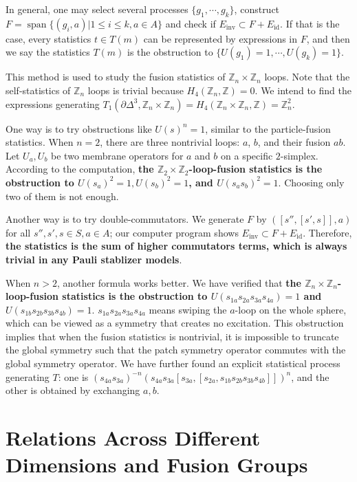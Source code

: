\documentclass[reprint, amsmath, amssymb, showpacs, floatfix, longbibliography, aps, twocolumn, superscriptaddress, nofootinbib]{revtex4-2}
\newcommand{\ZZ}{{\mathbb Z}}
\theoremstyle{definition}
\begin{document}
 In general, one may select several processes $\{g_1, \cdots, g_k\}$, construct $F=\operatorname{span}\{(g_i,a)|1\le i\le k,a\in A\}$ and check if $E_{\operatorname{inv}}\subset F + E_{\operatorname{id}}$. If that is the case, every statistics $t\in T(m)$ can be represented by expressions in $F$, and then we say the statistics $T(m)$ is the obstruction to $\{ U(g_1)=1, \cdots,  U(g_k)=1\}$.
 
 This method is used to study the fusion statistics of $\ZZ_n\times \ZZ_n$ loops. Note that the self-statistics of $\ZZ_n$ loops is trivial because $ H_4(\mathbb{Z}_n, \ZZ) = 0$. We intend to find the expressions generating $T_1(\partial \Delta^3,\ZZ_n\times \ZZ_n) = H_4(\mathbb{Z}_n \times \mathbb{Z}_n, \ZZ) = \mathbb{Z}_n^2$.
 
 One way is to try obstructions like $ U(s)^n=1$, similar to the particle-fusion statistics. When $n = 2$, there are three nontrivial loops: $a$, $b$, and their fusion $ab$. Let $U_a,U_b$ be two membrane operators for $a$ and $b$ on a specific $2$-simplex. According to the computation, \textbf{the $\ZZ_2\times \ZZ_2$-loop-fusion statistics is the obstruction to $ U(s_a)^2=1, U(s_b)^2=1$, and $ U(s_as_b)^2=1$}. Choosing only two of them is not enough.
 
 Another way is to try double-commutators. We generate $F$ by $([s'', [s', s]], a)$ for all $s'', s', s \in S,a\in A$; our computer program shows $E_{\operatorname{inv}}\subset F + E_{\operatorname{id}}$. Therefore, \textbf{the statistics is the sum of higher commutators terms, which is always trivial in any Pauli stablizer models}. 
 
 When $n>2$, another formula works better. We have verified that  \textbf{the $\ZZ_n\times \ZZ_n$-loop-fusion statistics is the obstruction to $ U(s_{1a} s_{2a} s_{3a} s_{4a})=1$ and $ U(s_{1b} s_{2b} s_{3b} s_{4b})=1$}. $s_{1a} s_{2a} s_{3a} s_{4a}$ means swiping the $a$-loop on the whole sphere, which can be viewed as a symmetry that creates no excitation. This obstruction implies that when the fusion statistics is nontrivial, it is impossible to truncate the global symmetry such that the patch symmetry operator commutes with the global symmetry operator. We have further found an explicit statistical process generating $T$: one is $(s_{4a} s_{3a})^{-n} (s_{4a} s_{3a} [s_{3a}, [s_{2a}, s_{1b} s_{2b} s_{3b} s_{4b}]])^n$, and the other is obtained by exchanging $a,b$.
 
 
 



\section{Relations Across Different Dimensions and Fusion Groups}\label{secFunctorial}
\end{document}
